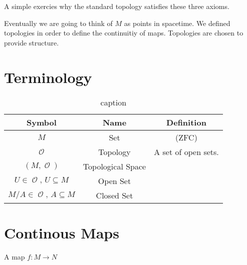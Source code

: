 \documentclass[a4paper, 11pt]{article}
\DeclareMathOperator{\Otop}{\mathcal{O}}
\begin{document}
\begin{example}

\end{example}

A simple exercies why the standard topology satisfies these three axioms.

Eventually we are going to think of $M$ as points in spacetime. We defined topologies in order to define the continuitiy of maps.
Topologies are chosen to provide structure.

\section{Terminology}
\begin{table}[htpb]
  \centering
  \caption{caption}
  \begin{tabular}{ccc}
    \hline
    Symbol & Name & Definition \\
    \hline 
    $M$ & Set & (ZFC) \\
    \hline
    $\Otop$ & Topology & A set of open sets.\\
    \hline
    $(M, \Otop)$ & Topological Space & \\
    \hline
    $U\in \Otop, \, U \subseteq M$ & Open Set & \\
    \hline
    $M/A \in \Otop, \, A \subseteq M$ & Closed Set & \\
  \end{tabular}
\end{table}

\section{Continous Maps}
A map $f: M \rightarrow N$
\end{document}
